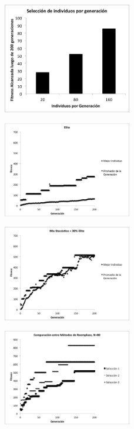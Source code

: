 \documentclass[letterpaper,twocolumn,10pt]{article}
\begin{document}
\begin{figure}[h]

\includegraphics[width=0.5\textwidth]{Selection_N.png}

\caption{}
\label{img:selection_n}

\end{figure}

\begin{figure}[h]

\includegraphics[width=0.5\textwidth]{Elite.png}

\caption{}
\label{img:elite}

\end{figure}

\begin{figure}[h]

\includegraphics[width=0.5\textwidth]{Mix.png}

\caption{}
\label{img:mix}

\end{figure}

\begin{figure}[h]

\includegraphics[width=0.5\textwidth]{Comparacion_Reemplazo.png}

\caption{}
\label{img:comparacion_reemplazo}

\end{figure}
\end{document}
